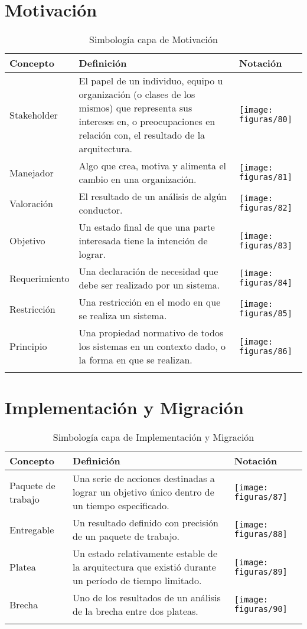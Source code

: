 \section{Motivación}
  \begin{longtable}
  	{|m{3cm}|m{4.8cm}|m{5.2cm}|}
  	\toprule
  	Concepto & Definición & Notación \\
  	\midrule
  	Stakeholder & El papel de un individuo, equipo u organización (o clases de los mismos) que representa sus intereses en, o preocupaciones en relación con, el resultado de la arquitectura. & \texttt{[image: figuras/80]} \\ \hline
  	Manejador & Algo que crea, motiva y alimenta el cambio en una organización. & \texttt{[image: figuras/81]} \\ \hline
  	Valoración & El resultado de un análisis de algún conductor. & \texttt{[image: figuras/82]} \\ \hline
  	Objetivo & Un estado final de que una parte interesada tiene la intención de lograr. & \texttt{[image: figuras/83]} \\ \hline
  	Requerimiento & Una declaración de necesidad que debe ser realizado por un sistema. & \texttt{[image: figuras/84]} \\ \hline
  	Restricción & Una restricción en el modo en que se realiza un sistema. & \texttt{[image: figuras/85]} \\ \hline
  	Principio & Una propiedad normativo de todos los sistemas en un contexto dado, o la forma en que se realizan. & \texttt{[image: figuras/86]} \\
	\bottomrule
	\captionsetup{width=.95\textwidth}
	\caption{Simbología capa de Motivación}
	\label{tabla35}
  \end{longtable}
  
\section{Implementación y Migración}
  \begin{longtable}
	{|m{3cm}|m{4.8cm}|m{4.8cm}|}
	\toprule
	Concepto & Definición & Notación \\
	\midrule
	Paquete de trabajo & Una serie de acciones destinadas a lograr un objetivo único dentro de un tiempo especificado. & \texttt{[image: figuras/87]} \\ \hline
	Entregable & Un resultado definido con precisión de un paquete de trabajo. & \texttt{[image: figuras/88]} \\ \hline
	Platea & Un estado relativamente estable de la arquitectura que existió durante un período de tiempo limitado. & \texttt{[image: figuras/89]} \\ \hline
	Brecha & Uno de los resultados de un análisis de la brecha entre dos plateas. & \texttt{[image: figuras/90]} \\
	\bottomrule
	\captionsetup{width=.95\textwidth}
	\caption{Simbología capa de Implementación y Migración}
	\label{tabla36}
  \end{longtable}
  
